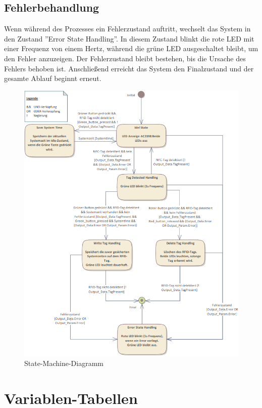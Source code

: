 \subsection*{Fehlerbehandlung}
\label{subsec:Fehlerbehandlung}

Wenn während des Prozesses ein Fehlerzustand auftritt, wechselt das System in den Zustand ''Error State Handling''. In diesem Zustand blinkt die rote LED mit einer Frequenz von einem Hertz, während die grüne LED ausgeschaltet bleibt, um den Fehler anzuzeigen. Der Fehlerzustand bleibt bestehen, bis die Ursache des Fehlers behoben ist. Anschließend erreicht das System den Finalzustand und der gesamte Ablauf beginnt erneut.
\begin{figure}[h!]
	\centering
	\includegraphics[width=1.0\textwidth]{images/StateMachine.png}
	\vspace{1cm}
	\caption{State-Machine-Diagramm}
	\label{fig:StateMachineDiagramm}
\end{figure}

\clearpage
\newpage
\section*{Variablen-Tabellen}
\label{sec:VariablenTabellen}

